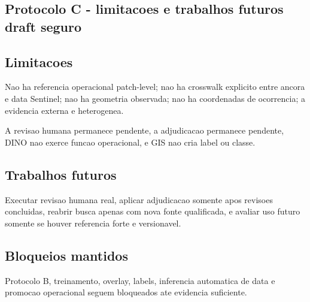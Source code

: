 
\subsection{Protocolo C - limitacoes e trabalhos futuros draft seguro}

\subsection{Limitacoes}
Nao ha referencia operacional patch-level; nao ha crosswalk explicito entre ancora e data Sentinel; nao ha geometria observada; nao ha coordenadas de ocorrencia; a evidencia externa e heterogenea.

A revisao humana permanece pendente, a adjudicacao permanece pendente, DINO nao exerce funcao operacional, e GIS nao cria label ou classe.

\subsection{Trabalhos futuros}
Executar revisao humana real, aplicar adjudicacao somente apos revisoes concluidas, reabrir busca apenas com nova fonte qualificada, e avaliar uso futuro somente se houver referencia forte e versionavel.

\subsection{Bloqueios mantidos}
Protocolo B, treinamento, overlay, labels, inferencia automatica de data e promocao operacional seguem bloqueados ate evidencia suficiente.
